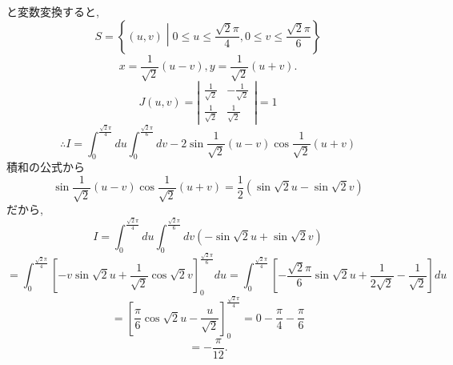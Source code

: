 \documentclass[a4paper,10pt,report]{amsart}
\theoremstyle{plain}
\theoremstyle{definition}
\theoremstyle{remark}
\begin{document}
\begin{enumerate}
        と変数変換すると, 
        \begin{equation*}
            S=\left\{(u,v)\middle| 0\leq u\leq\frac{\sqrt{2}\pi}{4},0\leq v\leq \frac{\sqrt{2}\pi}{6}\right\}
        \end{equation*}
        \begin{equation*}
            x=\frac{1}{\sqrt{2}}(u-v),y=\frac{1}{\sqrt{2}}(u+v).
        \end{equation*}
        \begin{equation*}
            J(u,v)=\left|\begin{array}{cc}
                \frac{1}{\sqrt{2}} & -\frac{1}{\sqrt{2}}\\
                \frac{1}{\sqrt{2}} & \frac{1}{\sqrt{2}}
            \end{array}\right|=1
        \end{equation*}
        \begin{equation*}
            \therefore I=\int_{0}^{\frac{\sqrt{2}\pi}{4}}du\int_{0}^{\frac{\sqrt{2}\pi}{6}}dv-2\sin{\frac{1}{\sqrt{2}}(u-v)}\cos{\frac{1}{\sqrt{2}}(u+v)}
        \end{equation*}
        積和の公式から
        \begin{equation*}
            \sin{\frac{1}{\sqrt{2}}(u-v)}\cos{\frac{1}{\sqrt{2}}(u+v)}=\frac{1}{2}(\sin{\sqrt{2}u}-\sin{\sqrt{2}v})
        \end{equation*}
        だから,
        \begin{equation*}
            I=\int_{0}^{\frac{\sqrt{2}\pi}{4}}du\int_{0}^{\frac{\sqrt{2}\pi}{6}}dv(-\sin{\sqrt{2}u}+\sin{\sqrt{2}v})
        \end{equation*}
        \begin{equation*}
            =\int_{0}^{\frac{\sqrt{2}\pi}{4}}{\left[-v\sin{\sqrt{2}u}+\frac{1}{\sqrt{2}}\cos{\sqrt{2}v}\right]}_{0}^{\frac{\sqrt{2}\pi}{6}}du=\int_{0}^{\frac{\sqrt{2}\pi}{4}}{\left[-\frac{\sqrt{2}\pi}{6}\sin{\sqrt{2}u}+\frac{1}{2\sqrt{2}}-\frac{1}{\sqrt{2}}\right]}du
        \end{equation*}
        \begin{equation*}
            =\left[\frac{\pi}{6}\cos{\sqrt{2}u}-\frac{u}{\sqrt{2}}\right]_{0}^{\frac{\sqrt{2}\pi}{4}}=0-\frac{\pi}{4}-\frac{\pi}{6}
        \end{equation*}
        \begin{equation*}
            =-\frac{\pi}{12}.
        \end{equation*}
    \end{enumerate}
\end{document}
